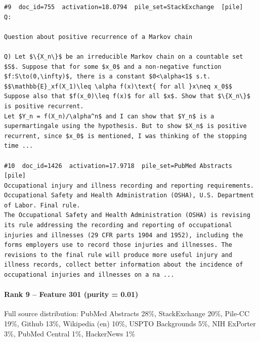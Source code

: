 \begin{verbatim}
#9  doc_id=755  activation=18.0794  pile_set=StackExchange  [pile]
Q:

Question about positive recurrence of a Markov chain

Q) Let $\{X_n\}$ be an irreducible Markov chain on a countable set $S$. Suppose that for some $x_0$ and a non-negative function $f:S\to(0,\infty)$, there is a constant $0<\alpha<1$ s.t. 
$$\mathbb{E}_xf(X_1)\leq \alpha f(x)\text{ for all }x\neq x_0$$
Suppose also that $f(x_0)\leq f(x)$ for all $x$. Show that $\{X_n\}$ is positive recurrent.
Let $Y_n = f(X_n)/\alpha^n$ and I can show that $Y_n$ is a supermartingale using the hypothesis. But to show $X_n$ is positive recurrent, since $x_0$ is mentioned, I was thinking of the stopping time ...

#10  doc_id=1426  activation=17.9718  pile_set=PubMed Abstracts  [pile]
Occupational injury and illness recording and reporting requirements. Occupational Safety and Health Administration (OSHA), U.S. Department of Labor. Final rule.
The Occupational Safety and Health Administration (OSHA) is revising its rule addressing the recording and reporting of occupational injuries and illnesses (29 CFR parts 1904 and 1952), including the forms employers use to record those injuries and illnesses. The revisions to the final rule will produce more useful injury and illness records, collect better information about the incidence of occupational injuries and illnesses on a na ...

\end{verbatim}

\paragraph*{Rank 9 -- Feature 301 (purity = 0.01)}

Full source distribution: PubMed Abstracts 28\%, StackExchange 20\%, Pile-CC 19\%, Github 13\%, Wikipedia (en) 10\%, USPTO Backgrounds 5\%, NIH ExPorter 3\%, PubMed Central 1\%, HackerNews 1\%


